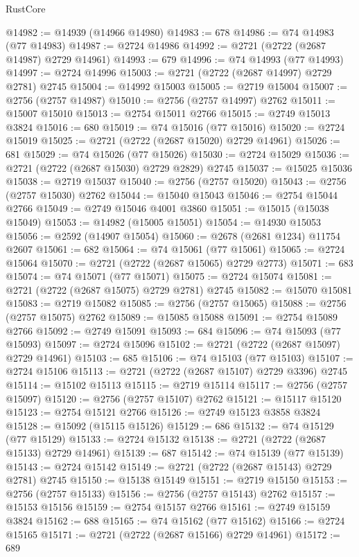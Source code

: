 \begin{lexlean}{RustCore}
\begin{coremodule}
@14982 := @14939 (@14966 @14980)
@14983 := 678
@14986 := @74 @14983 (@77 @14983)
@14987 := @2724 @14986
@14992 := @2721 (@2722 (@2687 @14987) @2729 @14961)
@14993 := 679
@14996 := @74 @14993 (@77 @14993)
@14997 := @2724 @14996
@15003 := @2721 (@2722 (@2687 @14997) @2729 @2781) @2745
@15004 := @14992 @15003
@15005 := @2719 @15004
@15007 := @2756 (@2757 @14987)
@15010 := @2756 (@2757 @14997) @2762
@15011 := @15007 @15010
@15013 := @2754 @15011 @2766
@15015 := @2749 @15013 @3824
@15016 := 680
@15019 := @74 @15016 (@77 @15016)
@15020 := @2724 @15019
@15025 := @2721 (@2722 (@2687 @15020) @2729 @14961)
@15026 := 681
@15029 := @74 @15026 (@77 @15026)
@15030 := @2724 @15029
@15036 := @2721 (@2722 (@2687 @15030) @2729 @2829) @2745
@15037 := @15025 @15036
@15038 := @2719 @15037
@15040 := @2756 (@2757 @15020)
@15043 := @2756 (@2757 @15030) @2762
@15044 := @15040 @15043
@15046 := @2754 @15044 @2766
@15049 := @2749 @15046 @4001 @3860
@15051 := @15015 (@15038 @15049)
@15053 := @14982 (@15005 @15051)
@15054 := @14930 @15053
@15056 := @2592 (@14907 @15054)
@15060 := @2678 (@2681 @1234) @11754 @2607
@15061 := 682
@15064 := @74 @15061 (@77 @15061)
@15065 := @2724 @15064
@15070 := @2721 (@2722 (@2687 @15065) @2729 @2773)
@15071 := 683
@15074 := @74 @15071 (@77 @15071)
@15075 := @2724 @15074
@15081 := @2721 (@2722 (@2687 @15075) @2729 @2781) @2745
@15082 := @15070 @15081
@15083 := @2719 @15082
@15085 := @2756 (@2757 @15065)
@15088 := @2756 (@2757 @15075) @2762
@15089 := @15085 @15088
@15091 := @2754 @15089 @2766
@15092 := @2749 @15091
@15093 := 684
@15096 := @74 @15093 (@77 @15093)
@15097 := @2724 @15096
@15102 := @2721 (@2722 (@2687 @15097) @2729 @14961)
@15103 := 685
@15106 := @74 @15103 (@77 @15103)
@15107 := @2724 @15106
@15113 := @2721 (@2722 (@2687 @15107) @2729 @3396) @2745
@15114 := @15102 @15113
@15115 := @2719 @15114
@15117 := @2756 (@2757 @15097)
@15120 := @2756 (@2757 @15107) @2762
@15121 := @15117 @15120
@15123 := @2754 @15121 @2766
@15126 := @2749 @15123 @3858 @3824
@15128 := @15092 (@15115 @15126)
@15129 := 686
@15132 := @74 @15129 (@77 @15129)
@15133 := @2724 @15132
@15138 := @2721 (@2722 (@2687 @15133) @2729 @14961)
@15139 := 687
@15142 := @74 @15139 (@77 @15139)
@15143 := @2724 @15142
@15149 := @2721 (@2722 (@2687 @15143) @2729 @2781) @2745
@15150 := @15138 @15149
@15151 := @2719 @15150
@15153 := @2756 (@2757 @15133)
@15156 := @2756 (@2757 @15143) @2762
@15157 := @15153 @15156
@15159 := @2754 @15157 @2766
@15161 := @2749 @15159 @3824
@15162 := 688
@15165 := @74 @15162 (@77 @15162)
@15166 := @2724 @15165
@15171 := @2721 (@2722 (@2687 @15166) @2729 @14961)
@15172 := 689

\end{coremodule}
\end{lexlean}
